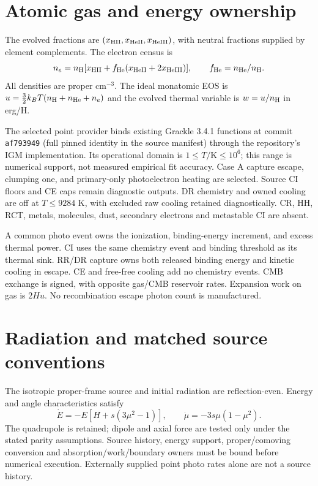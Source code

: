 \documentclass[11pt]{article}
\begin{document}
\section{Atomic gas and energy ownership}
The evolved fractions are $(x_{\rm HII},x_{\rm HeII},x_{\rm HeIII})$, with neutral fractions supplied by element complements. The electron census is
\begin{equation}
 n_e=n_{\rm H}[x_{\rm HII}+f_{\rm He}(x_{\rm HeII}+2x_{\rm HeIII})],\qquad f_{\rm He}=n_{\rm He}/n_{\rm H}.
\end{equation}
All densities are proper $\mathrm{cm}^{-3}$. The ideal monatomic EOS is $u=\frac32 k_BT(n_{\rm H}+n_{\rm He}+n_e)$ and the evolved thermal variable is $w=u/n_{\rm H}$ in erg/H.

The selected point provider binds existing Grackle 3.4.1 functions at commit \texttt{af793949} (full pinned identity in the source manifest) through the repository's IGM implementation\cite{grackle}. Its operational domain is $1\le T/\mathrm K\le10^6$; this range is numerical support, not measured empirical fit accuracy. Case A capture escape, clumping one, and primary-only photoelectron heating are selected. Source CI floors and CE caps remain diagnostic outputs. DR chemistry and owned cooling are off at $T\le9284$ K, with excluded raw cooling retained diagnostically. CR, HH, RCT, metals, molecules, dust, secondary electrons and metastable CI are absent.

A common photo event owns the ionization, binding-energy increment, and excess thermal power. CI uses the same chemistry event and binding threshold as its thermal sink. RR/DR capture owns both released binding energy and kinetic cooling in escape. CE and free-free cooling add no chemistry events. CMB exchange is signed, with opposite gas/CMB reservoir rates. Expansion work on gas is $2Hu$. No recombination escape photon count is manufactured.

\section{Radiation and matched source conventions}
The isotropic proper-frame source and initial radiation are reflection-even. Energy and angle characteristics satisfy
\begin{equation}
 \dot E=-E[H+s(3\mu^2-1)],\qquad \dot\mu=-3s\mu(1-\mu^2).
\end{equation}
The quadrupole is retained; dipole and axial force are tested only under the stated parity assumptions. Source history, energy support, proper/comoving conversion and absorption/work/boundary owners must be bound before numerical execution. Externally supplied point photo rates alone are not a source history.
\end{document}
